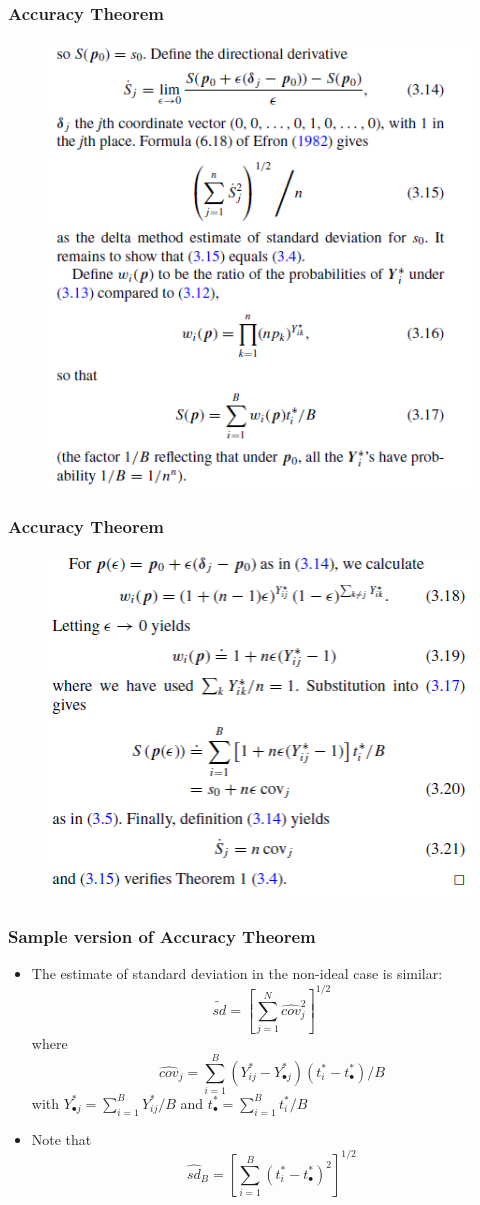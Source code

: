 \documentclass{beamer}
\begin{document}
\begin{frame}
\frametitle{Accuracy Theorem}
\begin{figure}[h]
\centering
\includegraphics[width=220bp, height= 180bp]{proof2_e.png}
\end{figure}
\end{frame}
\begin{frame}
\frametitle{Accuracy Theorem}
\begin{figure}[h]
\centering
\includegraphics[width=220bp, height= 180bp]{proof3_e.png}
\end{figure}
\end{frame}
\begin{frame}
\frametitle{Sample version of Accuracy Theorem}
\begin{itemize}
\item The estimate of standard deviation in the non-ideal case is similar: $$ \tilde{sd} = \left[ \sum_{j=1} ^N \widehat{cov}_j ^2\right] ^{1/2}$$
where
$$ \widehat{cov}_j = \sum_{i=1} ^B (Y_{ij} ^* - Y_{\bullet j} ^*) (t_i ^* - t_{\bullet} ^*) /B$$
with $Y_{\bullet j} ^* = \sum_{i=1} ^B Y_{ij} ^* /B$ and $t_{\bullet} ^* = \sum_{i=1} ^B t_{i} ^* /B$
\item Note that
$$ \hat{sd}_B = \left[ \sum_{i=1} ^B (t_i^* - t_{\bullet} ^*) ^2\right] ^{1/2}$$
\end{itemize}
\end{frame}
\end{document}
